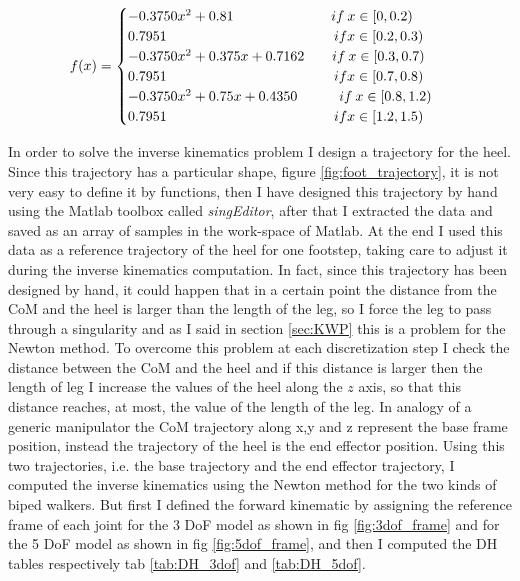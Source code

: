 \documentclass[a4paper]{article}
\begin{document}
\begin{equation}
  f(x) = \begin{cases} -0.3750x^2+0.81\qquad \qquad \quad \quad \quad if  \> x \in [0,0.2) \\
   0.7951 \qquad \qquad \qquad \qquad   \qquad \quad \quad if x \in [0.2,0.3) \\
   -0.3750x^2+0.375x+0.7162 \quad \quad if  \> x \in [0.3,0.7) \\
   0.7951 \qquad \qquad \qquad \qquad   \qquad \quad \quad  if x \in [0.7,0.8) \\
    -0.3750x^2+0.75x+0.4350\quad \quad \quad if  \> x \in [0.8,1.2) \\
   0.7951 \qquad \qquad \qquad \qquad   \qquad \quad \quad  if x \in [1.2,1.5)\end{cases} \\
\end{equation}

In order to solve the inverse kinematics problem I design a trajectory for the heel. Since this trajectory has a particular shape, figure \ref{fig:foot_trajectory}, it is not very easy to define it by functions, then I have designed this trajectory by hand using the Matlab toolbox called \textit{singEditor}, after that I extracted the data and saved as an array of samples in the work-space of Matlab. 
At the end I used this data as a reference trajectory of the heel for one footstep, taking care to adjust it during the inverse kinematics computation. In fact, since this trajectory has been designed by hand, it could happen that in a certain point the distance from the CoM and the heel is larger than the length of the leg, so I force the leg to pass through a singularity and as I said in section \ref{sec:KWP} this is a problem for the Newton method. To overcome this problem at each discretization step I check the distance between the CoM and the heel and if this distance is larger then the length of leg I increase the values of the heel along the $z$ axis, so that this distance reaches, at most, the value of the length of the leg.  In analogy of a generic manipulator the CoM trajectory along x,y and z represent the base frame position, instead the trajectory of the heel is the end effector position. Using this two trajectories, i.e. the base trajectory and the end effector trajectory, I computed the inverse kinematics using the Newton method for the two kinds of biped walkers. But first I defined the forward kinematic by assigning the reference frame of each joint  for the 3 DoF model as shown in fig \ref{fig:3dof_frame} and for the 5 DoF model as shown in fig \ref{fig:5dof_frame}, and then I computed the DH tables respectively  tab \ref{tab:DH_3dof} and \ref{tab:DH_5dof}.
\end{document}
